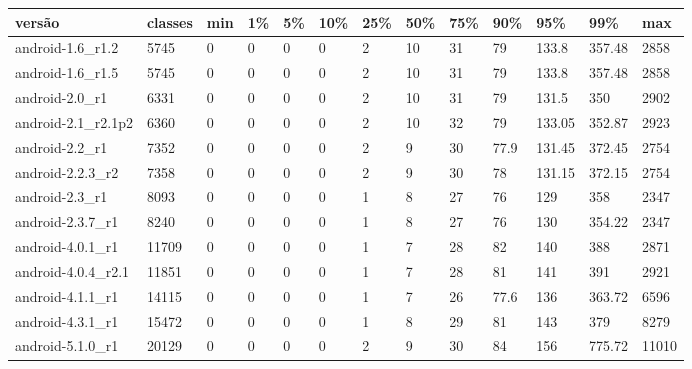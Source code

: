 \begin{tabular}{|l|l|l|l|l|l|l|l|l|l|l|l|l|}
\hline
versão&classes&min&1\%&5\%&10\%&25\%&50\%&75\%&90\%&95\%&99\%&max\\
\hline
android-1.6\_r1.2&5745&0&0&0&0&2&10&31&79&133.8&357.48&2858\\
\hline
android-1.6\_r1.5&5745&0&0&0&0&2&10&31&79&133.8&357.48&2858\\
\hline
android-2.0\_r1&6331&0&0&0&0&2&10&31&79&131.5&350&2902\\
\hline
android-2.1\_r2.1p2&6360&0&0&0&0&2&10&32&79&133.05&352.87&2923\\
\hline
android-2.2\_r1&7352&0&0&0&0&2&9&30&77.9&131.45&372.45&2754\\
\hline
android-2.2.3\_r2&7358&0&0&0&0&2&9&30&78&131.15&372.15&2754\\
\hline
android-2.3\_r1&8093&0&0&0&0&1&8&27&76&129&358&2347\\
\hline
android-2.3.7\_r1&8240&0&0&0&0&1&8&27&76&130&354.22&2347\\
\hline
android-4.0.1\_r1&11709&0&0&0&0&1&7&28&82&140&388&2871\\
\hline
android-4.0.4\_r2.1&11851&0&0&0&0&1&7&28&81&141&391&2921\\
\hline
android-4.1.1\_r1&14115&0&0&0&0&1&7&26&77.6&136&363.72&6596\\
\hline
android-4.3.1\_r1&15472&0&0&0&0&1&8&29&81&143&379&8279\\
\hline
android-5.1.0\_r1&20129&0&0&0&0&2&9&30&84&156&775.72&11010\\
\hline
\end{tabular}
